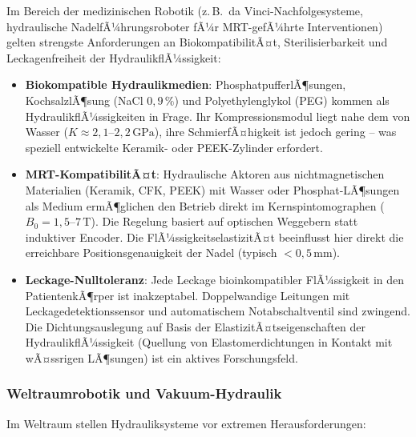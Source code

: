 ﻿\documentclass[a4paper,12pt]{scrreprt}
\theoremstyle{definition}
\begin{document}
Im Bereich der medizinischen Robotik (z.\,B.\ da Vinci-Nachfolge\-systeme,
hydraulische NadelfÃ¼hrungsroboter fÃ¼r MRT-gefÃ¼hrte Interventionen)
gelten strengste Anforderungen an BiokompatibilitÃ¤t, Sterilisierbarkeit
und Leckagenfreiheit der HydraulikflÃ¼ssigkeit:

\begin{itemize}
  \item \textbf{Biokompatible Hydraulikmedien}: Phosphatpuffer\-lÃ¶sungen,
    KochsalzlÃ¶sung (NaCl $0{,}9\,\%$) und Polyethylenglykol (PEG)
    kommen als HydraulikflÃ¼ssigkeiten in Frage. Ihr Kompressionsmodul
    liegt nahe dem von Wasser ($K \approx 2{,}1$--$2{,}2\,\mathrm{GPa}$),
    ihre SchmierfÃ¤higkeit ist jedoch gering -- was speziell entwickelte
    Keramik- oder PEEK-Zylinder erfordert.
  \item \textbf{MRT-KompatibilitÃ¤t}: Hydraulische Aktoren aus
    nichtmagnetischen Materialien (Keramik, CFK, PEEK) mit
    Wasser oder Phosphat-LÃ¶sungen als Medium ermÃ¶glichen den Betrieb
    direkt im Kernspintomographen ($B_0 = 1{,}5$--$7\,\mathrm{T}$).
    Die Regelung basiert auf optischen Weggebern statt induktiver
    Encoder. Die FlÃ¼ssigkeitselastizitÃ¤t beeinflusst hier direkt
    die erreichbare Positionsgenauigkeit der Nadel (typisch $< 0{,}5\,\mathrm{mm}$).
  \item \textbf{Leckage-Nulltoleranz}: Jede Leckage bioinkompatibler
    FlÃ¼ssigkeit in den PatientenkÃ¶rper ist inakzeptabel. Doppelwandige
    Leitungen mit Leckagedetektionssensor und automatischem Notabschalt\-ventil
    sind zwingend. Die Dichtungsauslegung auf Basis der
    ElastizitÃ¤tseigenschaften der HydraulikflÃ¼ssigkeit (Quellung von
    Elastomerdichtungen in Kontakt mit wÃ¤ssrigen LÃ¶sungen) ist ein
    aktives Forschungsfeld.
\end{itemize}

\subsubsection{Weltraumrobotik und Vakuum-Hydraulik}

Im Weltraum stellen Hydrauliksysteme vor extremen Heraus\-forderungen:
\end{document}
